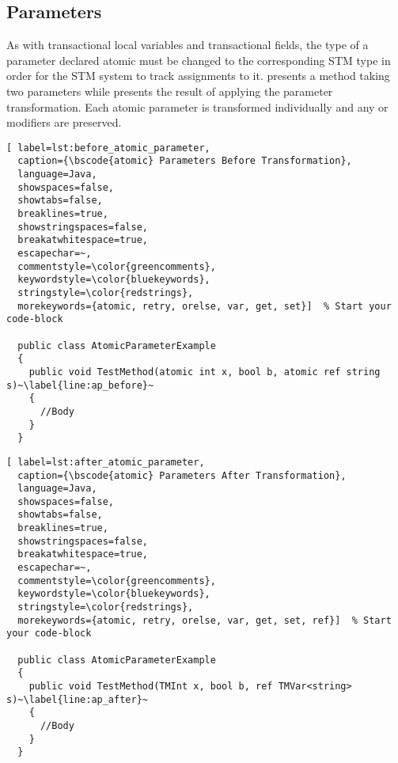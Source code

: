 \subsection{Parameters}
\label{subsec:roslyn_extension_parameters}
As with transactional local variables and transactional fields, the type of a parameter declared atomic must be changed to the corresponding \ac{STM} type in order for the \ac{STM} system to track assignments to it.  presents a method taking two  parameters while  presents the result of applying the parameter transformation. Each atomic parameter is transformed individually and any  or  modifiers are preserved.


\begin{lstlisting}[ label=lst:before_atomic_parameter,
  caption={\bscode{atomic} Parameters Before Transformation},
  language=Java,  
  showspaces=false,
  showtabs=false,
  breaklines=true,
  showstringspaces=false,
  breakatwhitespace=true,
  escapechar=~,
  commentstyle=\color{greencomments},
  keywordstyle=\color{bluekeywords},
  stringstyle=\color{redstrings},
  morekeywords={atomic, retry, orelse, var, get, set}]  % Start your code-block

  public class AtomicParameterExample
  {
    public void TestMethod(atomic int x, bool b, atomic ref string s)~\label{line:ap_before}~
    {
      //Body
    }
  }
\end{lstlisting}

\begin{lstlisting}[ label=lst:after_atomic_parameter,
  caption={\bscode{atomic} Parameters After Transformation},
  language=Java,  
  showspaces=false,
  showtabs=false,
  breaklines=true,
  showstringspaces=false,
  breakatwhitespace=true,
  escapechar=~,
  commentstyle=\color{greencomments},
  keywordstyle=\color{bluekeywords},
  stringstyle=\color{redstrings},
  morekeywords={atomic, retry, orelse, var, get, set, ref}]  % Start your code-block

  public class AtomicParameterExample
  {
    public void TestMethod(TMInt x, bool b, ref TMVar<string> s)~\label{line:ap_after}~
    {
      //Body
    }
  }
\end{lstlisting}


